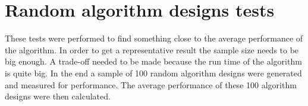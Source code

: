 

\section{Random algorithm designs tests}

These tests were performed to find something close to the average performance of the \CTC algorithm. In order to get a representative result the sample size needs to be big enough. A trade-off needed to be made because the run time of the algorithm is quite big. In the end a sample of 100 random algorithm designs were generated and measured for performance. The average performance of these 100 algorithm designs were then calculated.

